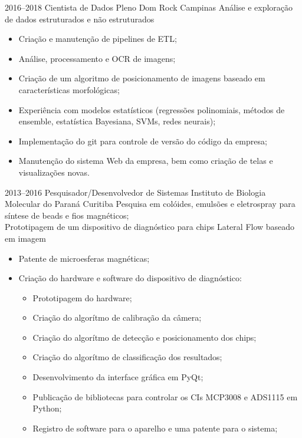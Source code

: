 \documentclass[11pt,a4paper,sans]{moderncv}        %
\begin{document}
\vspace{1em}
\cventry
{2016--2018}
{Cientista de Dados Pleno}
{Dom Rock}
{Campinas}{}
{Análise e exploração de dados estruturados e não estruturados}
\begin{itemize}%
	\item Criação e manutenção de pipelines de ETL;
	\item Análise, processamento e OCR de imagens;
	\item Criação de um algoritmo de posicionamento de imagens baseado em características morfológicas;
	\item Experiência com modelos estatísticos (regressões polinomiais, métodos de ensemble, estatística Bayesiana, SVMs, redes neurais);
	\item Implementação do git para controle de versão do código da empresa;
	\item Manutenção do sistema Web da empresa, bem como criação de telas e visualizações novas.
\end{itemize}

\vspace{1em}
\cventry
{2013--2016}
{Pesquisador/Desenvolvedor de Sistemas}
{Instituto de Biologia Molecular do Paraná}
{Curitiba}{}
{Pesquisa em colóides, emulsões e eletrospray para síntese de beads e fios magnéticos;\\
	Prototipagem de um dispositivo de diagnóstico para chips Lateral Flow baseado em imagem}
\begin{itemize}%
	\item Patente de microesferas magnéticas;
	\item Criação do hardware e software do dispositivo de diagnóstico:
	      \begin{itemize}%
		      \item Prototipagem do hardware;
		      \item Criação do algorítmo de calibração da câmera;
		      \item Criação do algorítmo de detecção e posicionamento dos chips;
		      \item Criação do algorítmo de classificação dos resultados;
		      \item Desenvolvimento da interface gráfica em PyQt;
		      \item Publicação de bibliotecas para controlar os CIs MCP3008 e ADS1115 em Python;
		      \item Registro de software para o aparelho e uma patente para o sistema;
	      \end{itemize}
\end{itemize}
\end{document}
